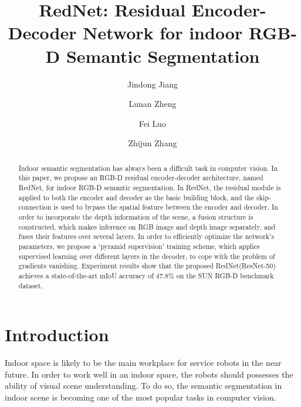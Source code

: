 \documentclass[runningheads]{llncs}
\begin{document}
\title{RedNet: Residual Encoder-Decoder Network for indoor RGB-D Semantic Segmentation}
\author{Jindong Jiang \and
Lunan Zheng \and
Fei Luo \and Zhijun Zhang}



\maketitle              \begin{abstract}
Indoor semantic segmentation has always been a difficult task in computer vision. In this paper, we propose an RGB-D residual encoder-decoder architecture, named RedNet, for indoor RGB-D semantic segmentation. In RedNet, the residual module is applied to both the encoder and decoder as the basic building block, and the skip-connection is used to bypass the spatial feature between the encoder and decoder. In order to incorporate the depth information of the scene, a fusion structure is constructed, which makes inference on RGB image and depth image separately, and fuses their features over several layers. In order to efficiently optimize the network's parameters, we propose a `pyramid supervision' training scheme, which applies supervised learning over different layers in the decoder, to cope with the problem of gradients vanishing. Experiment results show that the proposed RedNet(ResNet-50) achieves a state-of-the-art mIoU accuracy of 47.8\% on the SUN RGB-D benchmark dataset.

\end{abstract}
\section{Introduction}

Indoor space is likely to be the main workplace for service robots in the near future. In order to work well in an indoor space, the robots should possesses the ability of visual scene understanding. To do so, the semantic segmentation in indoor scene is becoming one of the most popular tasks in computer vision.
\end{document}
